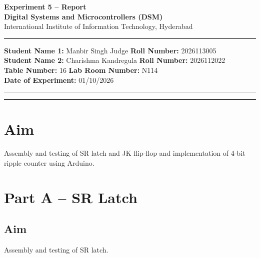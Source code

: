 \documentclass[11pt, a4paper]{article}
\begin{document}
\thispagestyle{no_hdr_border_rule}

\begin{center}
    {\Large \textbf{Experiment 5 -- Report}} \\[0.2cm]
    {\large \textbf{Digital Systems and Microcontrollers (DSM)}} \\[0.1cm]
    {\normalsize International Institute of Information Technology, Hyderabad} \\[0.3cm]
\end{center}

\vspace{0.2cm}
\hrule
\vspace{0.4cm}

\noindent \textbf{Student Name 1:} Manbir Singh Judge \hfill \textbf{Roll Number:} 2026113005 \\
\noindent \textbf{Student Name 2:} Charishma Kandregula \hfill \textbf{Roll Number:} 2026112022 \\
\noindent \textbf{Table Number:} 16 \hfill \textbf{Lab Room Number:} N114 \\
\noindent \textbf{Date of Experiment:} 01/10/2026

\vspace{0.4cm}
\hrule
\vspace{0.5cm}

\vspace{1em}

\tableofcontents
\vspace{0.5cm}
\hrule
\vspace{0.8cm}

\newpage
{}

\section{Aim}

Assembly and testing of SR latch and JK flip-flop and implementation of 4-bit ripple counter using Arduino.

\section{Part A -- SR Latch}

\subsection{Aim}
Assembly and testing of SR latch.
\end{document}
